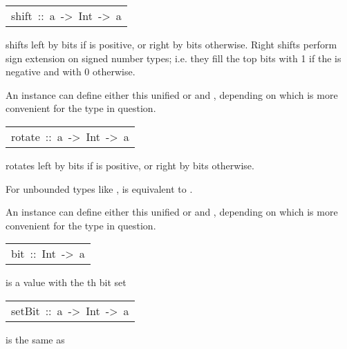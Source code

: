 \begin{haddockdesc}
\begin{haddockdesc}
\end{haddockdesc}
\begin{haddockdesc}
\item[\begin{tabular}{@{}l}
shift\ ::\ a\ ->\ Int\ ->\ a
\end{tabular}]\haddockbegindoc
{} shifts  left by  bits if  is positive,
        or right by  bits otherwise.
        Right shifts perform sign extension on signed number types;
        i.e. they fill the top bits with 1 if the  is negative
        and with 0 otherwise.
\par
An instance can define either this unified  or  and
        , depending on which is more convenient for the type in
        question. 
\par

\end{haddockdesc}
\begin{haddockdesc}
\item[\begin{tabular}{@{}l}
rotate\ ::\ a\ ->\ Int\ ->\ a
\end{tabular}]\haddockbegindoc
{} rotates  left by  bits if  is positive,
        or right by  bits otherwise.
\par
For unbounded types like ,  is equivalent to .
\par
An instance can define either this unified  or  and
        , depending on which is more convenient for the type in
        question. 
\par

\end{haddockdesc}
\begin{haddockdesc}
\item[\begin{tabular}{@{}l}
bit\ ::\ Int\ ->\ a
\end{tabular}]\haddockbegindoc
{} is a value with the th bit set
\par

\end{haddockdesc}
\begin{haddockdesc}
\item[\begin{tabular}{@{}l}
setBit\ ::\ a\ ->\ Int\ ->\ a
\end{tabular}]\haddockbegindoc
{} is the same as 
\par


\end{haddockdesc}
\end{haddockdesc}
